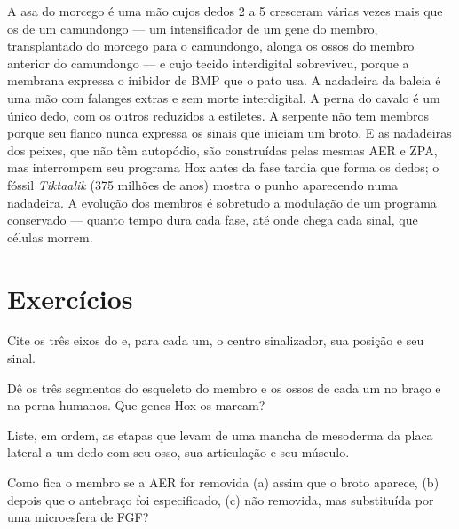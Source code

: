 \begin{example}\label{ex:b2:limb-organogenesis:evolution}
A asa do morcego é uma mão cujos dedos 2 a 5 cresceram várias vezes
mais que os de um camundongo --- um intensificador de um gene do membro,
transplantado do morcego para o camundongo, alonga os ossos do membro
anterior do camundongo --- e cujo tecido interdigital sobreviveu,
porque a membrana expressa o inibidor de BMP que o pato usa. A
nadadeira da baleia é uma mão com falanges extras e sem morte
interdigital. A perna do cavalo é um único dedo, com os outros
reduzidos a estiletes. A serpente não tem membros porque seu flanco
nunca expressa os sinais que iniciam um broto. E as nadadeiras dos
peixes, que não têm autopódio, são construídas pelas mesmas AER e ZPA,
mas interrompem seu programa Hox antes da fase tardia que forma os
dedos; o fóssil \emph{Tiktaalik} (375 milhões de anos) mostra o punho
aparecendo numa nadadeira. A evolução dos membros é sobretudo a
modulação de um programa conservado --- quanto tempo dura cada fase,
até onde chega cada sinal, que células morrem.
\end{example}

\section{Exercícios}

\begin{exercise}[$\star$]\label{exo:b2:limb-organogenesis:1}
Cite os três eixos do  e, para cada um, o centro
sinalizador, sua posição e seu sinal.
\end{exercise}

\begin{exercise}[$\star$]\label{exo:b2:limb-organogenesis:2}
Dê os três segmentos do esqueleto do membro e os ossos de cada um no
braço e na perna humanos. Que genes Hox os marcam?
\end{exercise}

\begin{exercise}[$\star$]\label{exo:b2:limb-organogenesis:3}
Liste, em ordem, as etapas que levam de uma mancha de mesoderma da
placa lateral a um dedo com seu osso, sua articulação e seu músculo.
\end{exercise}

\begin{exercise}[$\star$]\label{exo:b2:limb-organogenesis:4}
Como fica o membro se a AER for removida (a) assim que o broto
aparece, (b) depois que o antebraço foi especificado, (c) não removida,
mas substituída por uma microesfera de FGF?
\end{exercise}

